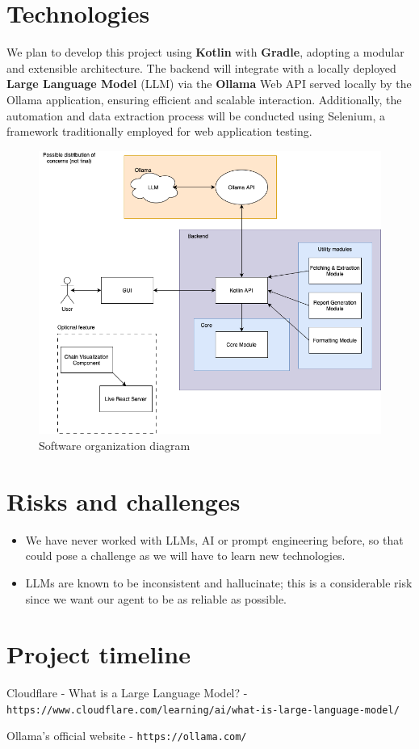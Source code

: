 \documentclass{article}
\begin{document}
	\section{Technologies}
	\setlength\parindent{24pt}		
        We plan to develop this project using \textbf{Kotlin} with \textbf{Gradle}, adopting a modular and extensible architecture. The backend will integrate with a locally deployed \textbf{Large Language Model} (LLM) via the \textbf{Ollama} Web API served locally by the Ollama application, ensuring efficient and scalable interaction. Additionally, the automation and data extraction process will be conducted using Selenium, a framework traditionally employed for web application testing.
	\begin{figure}[htbp]
	\centering
	\includegraphics[scale=0.4]{PFC - V2.drawio.png}	
	\caption{Software organization diagram}
	\end{figure}
	
	\section{Risks and challenges}
	\begin{itemize}
		\item We have never worked with LLMs, AI or prompt engineering before, so that could pose a challenge as we will have to learn new technologies.
		\item LLMs are known to be inconsistent and hallucinate; this is a considerable risk since we want our agent to be as reliable as possible.
	\end{itemize}
	
	\section{Project timeline}
	
	\pagebreak
	
		\begin{thebibliography}{9}
			Cloudflare - What is a Large Language Model? - \texttt{https://www.cloudflare.com/learning/ai/what-is-large-language-model/}
			
			Ollama's official website - \texttt{https://ollama.com/}
		\end{thebibliography}
	
\end{document}
